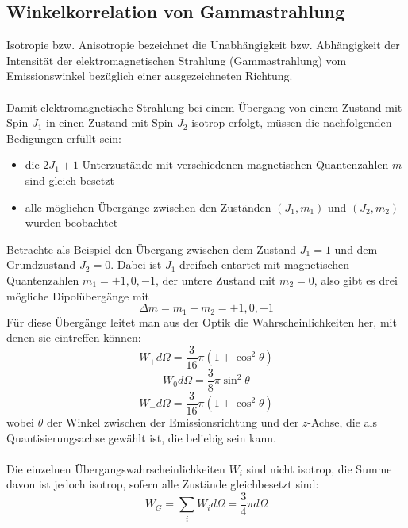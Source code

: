 \documentclass[a4paper,titlepage]{scrartcl}
\numberwithin{equation}{section}
\begin{document}
\subsection{Winkelkorrelation von Gammastrahlung}
Isotropie bzw. Anisotropie bezeichnet die Unabhängigkeit bzw. Abhängigkeit der Intensität der elektromagnetischen Strahlung (Gammastrahlung) vom Emissionswinkel bezüglich einer ausgezeichneten Richtung.\\ \\
Damit elektromagnetische Strahlung bei einem Übergang von einem Zustand mit Spin $J_1$ in einen Zustand mit Spin $J_2$ isotrop erfolgt, müssen die nachfolgenden Bedigungen erfüllt sein:
\begin{itemize}
\item die $2J_1 + 1$ Unterzustände mit verschiedenen magnetischen Quantenzahlen $m$ sind gleich besetzt
\item alle möglichen Übergänge zwischen den Zuständen $(J_1, m_1)$ und $(J_2, m_2)$ wurden beobachtet
\end{itemize}
Betrachte als Beispiel den Übergang zwischen dem Zustand $J_1=1$ und dem Grundzustand $J_2=0$. Dabei ist $J_1$ dreifach entartet mit magnetischen Quantenzahlen $m_1=+1, 0, -1$, der untere Zustand mit $m_2=0$, also gibt es drei mögliche Dipolübergänge mit
\begin{equation*}
\Delta m=m_1-m_2=+1, 0, -1
\end{equation*}
Für diese Übergänge leitet man aus der Optik die Wahrscheinlichkeiten her, mit denen sie eintreffen können:
\begin{equation*}
W_+ d\Omega=\frac{3}{16} \pi (1 + \cos^2{\theta})
\end{equation*}
\begin{equation*}
W_0 d\Omega=\frac{3}{8} \pi \sin^2{\theta}
\end{equation*}
\begin{equation*}
W_- d\Omega=\frac{3}{16} \pi (1 + \cos^2{\theta})
\end{equation*}
wobei $\theta$ der Winkel zwischen der Emissionsrichtung und der $z$-Achse, die als Quantisierungsachse gewählt ist, die beliebig sein kann.\\ \\
Die einzelnen Übergangswahrscheinlichkeiten $W_i$ sind nicht isotrop, die Summe davon ist jedoch isotrop, sofern alle Zustände gleichbesetzt sind:
\begin{equation*}
W_G=\sum\limits_{i} W_i d\Omega=\frac{3}{4} \pi d\Omega
\end{equation*}
\end{document}
